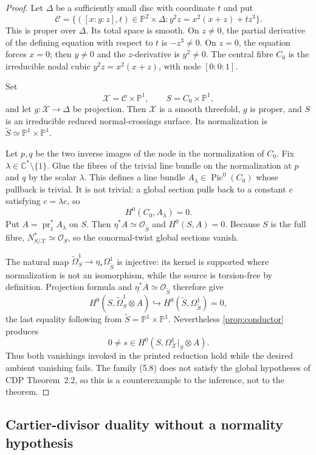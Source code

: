 \begin{proof}
Let $\Delta$ be a sufficiently small disc with coordinate $t$ and put
\[
\mathcal C=
\{([x:y:z],t)\in\mathbb P^2\times\Delta:
y^2z=x^2(x+z)+tz^3\}.
\tag{5.8}
\]
This is proper over $\Delta$.  Its total space is smooth.  On $z\ne0$, the
partial derivative of the defining equation with respect to $t$ is
$-z^3\ne0$.  On $z=0$, the equation forces $x=0$; then $y\ne0$ and the
$z$-derivative is $y^2\ne0$.  The central fibre $C_0$ is the irreducible
nodal cubic $y^2z=x^2(x+z)$, with node $[0:0:1]$.

Set
\[
\mathcal X=\mathcal C\times\mathbb P^1,\qquad
S=C_0\times\mathbb P^1,
\]
and let $g:\mathcal X\to\Delta$ be projection.  Then $\mathcal X$ is a
smooth threefold, $g$ is proper, and $S$ is an irreducible reduced
normal-crossings surface.  Its normalization is
$\widetilde S\simeq\mathbb P^1\times\mathbb P^1$.

Let $p,q$ be the two inverse images of the node in the normalization of
$C_0$.  Fix $\lambda\in\mathbb C^*\setminus\{1\}$.  Glue the fibres of
the trivial line bundle on the normalization at $p$ and $q$ by the scalar
$\lambda$.  This defines a line bundle
$A_\lambda\in\operatorname{Pic}^0(C_0)$ whose pullback is trivial.  It is
not trivial: a global section pulls back to a constant $c$ satisfying
$c=\lambda c$, so
\[
H^0(C_0,A_\lambda)=0.
\tag{5.9}
\]
Put $A=\operatorname{pr}_1^*A_\lambda$ on $S$.  Then
$\eta^*A\simeq\mathcal O_{\widetilde S}$ and $H^0(S,A)=0$.
Because $S$ is the full fibre,
$N^*_{S/\mathcal X}\simeq\mathcal O_S$, so the conormal-twist global
sections vanish.

The natural map
$\widetilde\Omega^1_S\to\eta_*\Omega^1_{\widetilde S}$ is injective:
its kernel is supported where normalization is not an isomorphism, while
the source is torsion-free by definition.  Projection formula and
$\eta^*A\simeq\mathcal O_{\widetilde S}$ therefore give
\[
H^0(S,\widetilde\Omega^1_S\otimes A)
\hookrightarrow
H^0(\widetilde S,\Omega^1_{\widetilde S})=0,
\tag{5.10}
\]
the last equality following from
$\widetilde S=\mathbb P^1\times\mathbb P^1$.
Nevertheless \cref{prop:conductor} produces
\[
0\ne s\in H^0(S,\Omega^1_{\mathcal X}|_S\otimes A).
\]
Thus both vanishings invoked in the printed reduction hold while the desired
ambient vanishing fails.  The family (5.8) does not satisfy the global
hypotheses of CDP Theorem~2.2, so this is a counterexample to the inference,
not to the theorem.
\end{proof}

\subsection{Cartier-divisor duality without a normality hypothesis}

